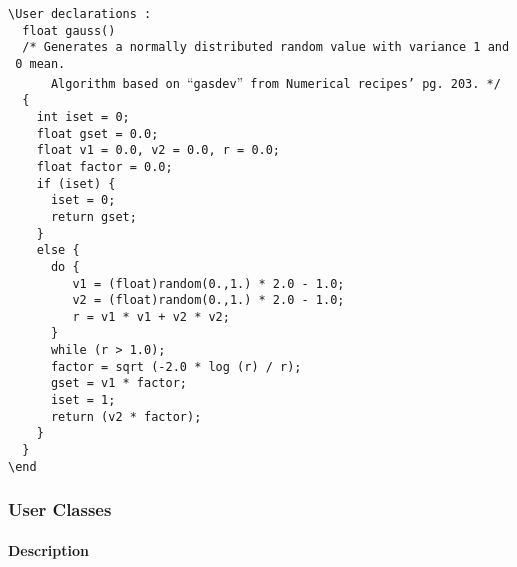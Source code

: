 \documentclass{book}
\begin{document}
\texttt{\textbackslash{}User~declarations~:}\\\texttt{~~float~gauss()}\\\texttt{~~/*~Generates~a~normally~distributed~random~value~with~variance~1~and~0~mean.}\\\texttt{~~~~~~Algorithm~based~on~}``\texttt{gasdev}''\texttt{~from~Numerical~recipes'~pg.~203.~*/}\\\texttt{~~\{}\\\texttt{~~~~int~iset~=~0;}\\\texttt{~~~~float~gset~=~0.0;}\\\texttt{~~~~float~v1~=~0.0,~v2~=~0.0,~r~=~0.0;}\\\texttt{~~~~float~factor~=~0.0;}\\\texttt{~~~~if~(iset)~\{}\\\texttt{~~~~~~iset~=~0;}\\\texttt{~~~~~~return~gset;}\\\texttt{~~~~\}}\\\texttt{~~~~else~\{~~~~}\\\texttt{~~~~~~do~\{}\\\texttt{~~~~~~~~~v1~=~(float)random(0.,1.)~*~2.0~-~1.0;}\\\texttt{~~~~~~~~~v2~=~(float)random(0.,1.)~*~2.0~-~1.0;}\\\texttt{~~~~~~~~~r~=~v1~*~v1~+~v2~*~v2;}\\\texttt{~~~~~~\}~}\\\texttt{~~~~~~while~(r~\textgreater{}~1.0);}\\\texttt{~~~~~~factor~=~sqrt~(-2.0~*~log~(r)~/~r);}\\\texttt{~~~~~~gset~=~v1~*~factor;}\\\texttt{~~~~~~iset~=~1;}\\\texttt{~~~~~~return~(v2~*~factor);}\\\texttt{~~~~\}}\\\texttt{~~\}}\\\texttt{\textbackslash{}end}

\subsubsection{User Classes}\label{user-classes}

\paragraph{Description}\label{description-2}
~\\
\end{document}
